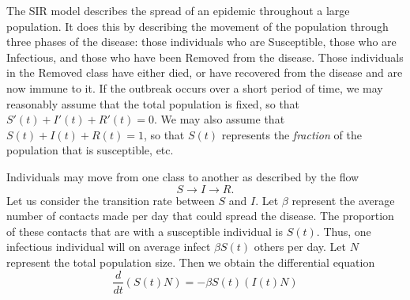 % 
% 
% 
% 
% 
% 
% 
% 
The SIR model describes the spread of an epidemic throughout a large population.
It does this by describing the movement of the population through three phases of the disease: those individuals who are Susceptible, those who are Infectious, and those who have been Removed from the disease.
Those individuals in the Removed class have either died, or have recovered from the disease and are now immune to it.
If the outbreak occurs over a short period of time, we may reasonably assume that the total population is fixed, so that $S'(t) + I'(t) + R'(t) = 0$.
We may also assume that $S(t) + I(t) + R(t) = 1$, so that $S(t)$ represents the \textit{fraction} of the population that is susceptible, etc. 

Individuals may move from one class to another as described by the flow 
\[S \to I \to R.\]
Let us consider the transition rate between $S$ and $I $.
Let $\beta$ represent the average number of contacts made per day that could spread the disease.
The proportion of these contacts that are with a susceptible individual is $S(t)$.
Thus, one infectious individual will on average infect $\beta S(t)$ others per day.
Let $N$ represent the total population size.
Then we obtain the differential equation
\[\frac{d}{dt}(S(t) N) = -\beta S(t) (I(t) N)\]
 
